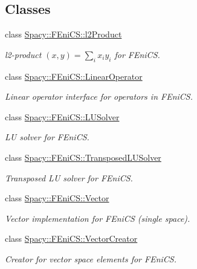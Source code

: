 \subsection*{Classes}
\begin{DoxyCompactItemize}
\item 
class \hyperlink{classSpacy_1_1FEniCS_1_1l2Product}{Spacy\-::\-F\-Eni\-C\-S\-::l2\-Product}
\begin{DoxyCompactList}\small\item\em l2-\/product $(x,y) = \sum_i x_i y_i $ for F\-Eni\-C\-S. \end{DoxyCompactList}\item 
class \hyperlink{classSpacy_1_1FEniCS_1_1LinearOperator}{Spacy\-::\-F\-Eni\-C\-S\-::\-Linear\-Operator}
\begin{DoxyCompactList}\small\item\em Linear operator interface for operators in F\-Eni\-C\-S. \end{DoxyCompactList}\item 
class \hyperlink{classSpacy_1_1FEniCS_1_1LUSolver}{Spacy\-::\-F\-Eni\-C\-S\-::\-L\-U\-Solver}
\begin{DoxyCompactList}\small\item\em L\-U solver for F\-Eni\-C\-S. \end{DoxyCompactList}\item 
class \hyperlink{classSpacy_1_1FEniCS_1_1TransposedLUSolver}{Spacy\-::\-F\-Eni\-C\-S\-::\-Transposed\-L\-U\-Solver}
\begin{DoxyCompactList}\small\item\em Transposed L\-U solver for F\-Eni\-C\-S. \end{DoxyCompactList}\item 
class \hyperlink{classSpacy_1_1FEniCS_1_1Vector}{Spacy\-::\-F\-Eni\-C\-S\-::\-Vector}
\begin{DoxyCompactList}\small\item\em Vector implementation for F\-Eni\-C\-S (single space). \end{DoxyCompactList}\item 
class \hyperlink{classSpacy_1_1FEniCS_1_1VectorCreator}{Spacy\-::\-F\-Eni\-C\-S\-::\-Vector\-Creator}
\begin{DoxyCompactList}\small\item\em Creator for vector space elements for F\-Eni\-C\-S. \end{DoxyCompactList}\end{DoxyCompactItemize}
